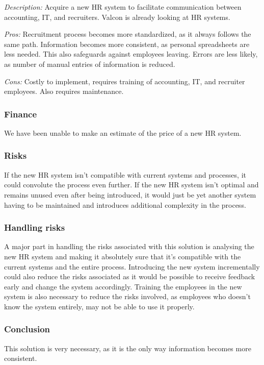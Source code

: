 \emph{Description:} Acquire a new HR system to facilitate communication between accounting, IT, and recruiters.
Valcon is already looking at HR systems.

\emph{Pros:} Recruitment process becomes more standardized, as it always follows the same path.
Information becomes more consistent, as personal spreadsheets are less needed. 
This also safeguards against employees leaving.
Errors are less likely, as number of manual entries of information is reduced.

\emph{Cons:} Costly to implement, requires training of accounting, IT, and recruiter employees.
Also requires maintenance.

\subsubsection{Finance}
We have been unable to make an estimate of the price of a new HR system.

\subsubsection{Risks}
If the new HR system isn't compatible with current systems and processes, it could convolute the process even further. 
If the new HR system isn't optimal and remains unused even after being introduced, it would just be yet another system having to be maintained and introduces additional complexity in the process.

\subsubsection{Handling risks}
A major part in handling the risks associated with this solution is analysing the new HR system and making it absolutely sure that it's compatible with the current systems and the entire process. 
Introducing the new system incrementally could also reduce the risks associated as it would be possible to receive feedback early and change the system accordingly. 
Training the employees in the new system is also necessary to reduce the risks involved, as employees who doesn't know the system entirely, may not be able to use it properly.

\subsubsection{Conclusion} 
This solution is very necessary, as it is the only way information becomes more consistent.
